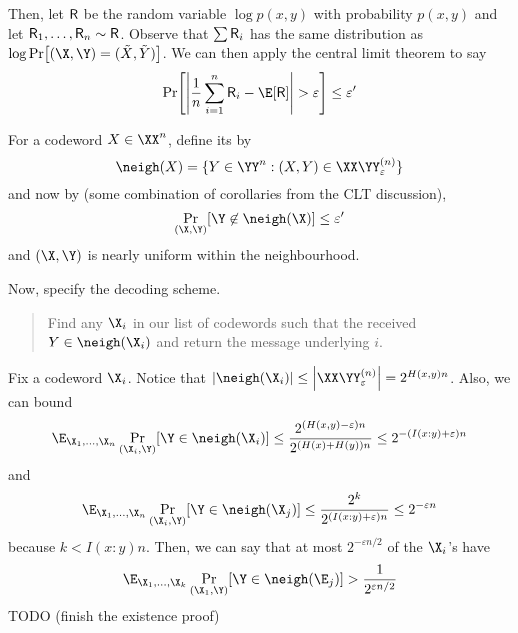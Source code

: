 \documentclass[class=co432,notes,tikz]{agony}
\begin{document}
\begin{prf}
  Then, let $\mathsf R$ be the random variable $\log p(x,y)$ with probability $p(x,y)$
  and let $\mathsf R_1,\dotsc,\mathsf R_n \sim \mathsf R$.
  Observe that $\sum \mathsf R_i$ has the same distribution as $\log \Pr[(\X,\Y)=(\tilde X,\tilde Y)]$.
  We can then apply the central limit theorem to say
  \[ \Pr[\abs{\frac1n\sum_{i=1}^n \rv R_i - \E[\rv R]} > \varepsilon] \leq \varepsilon' \]

  For a codeword $X \in \XX^n$, define its  by
  \[ \neigh(X) = \{Y \in \YY^n : (X,Y) \in \XX\YY_{\varepsilon}^{(n)}\} \]
  and now by (some combination of corollaries from the CLT discussion),
  \[ \Pr_{(\X,\Y)}[\Y \not\in \neigh(\X)] \leq \varepsilon' \]
  and $(\X,\Y)$ is nearly uniform within the neighbourhood.

  Now, specify the decoding scheme.
  \begin{quote}
    Find any $\X_i$ in our list of codewords
    such that the received $Y \in \neigh(\X_i)$
    and return the message underlying $i$.
  \end{quote}
  Fix a codeword $\X_i$.
  Notice that $\abs{\neigh(\X_i)} \leq \abs{\XX\YY_\varepsilon^{(n)}} = 2^{H(x,y)n}$.
  Also, we can bound
  \begin{align*}
    \E_{\X_1,\dotsc,\X_n}\Pr_{(\X_i,\Y)}[\Y \in \neigh(\X_i)] \leq \frac{2^{(H(x,y)-\varepsilon) n}}{2^{(H(x)+H(y))n}} \leq 2^{-(I(x:y)+\varepsilon)n}
  \end{align*}
  and
  \begin{align*}
    \E_{\X_1,\dotsc,\X_n}\Pr_{(\X_i,\Y)}[\Y \in \neigh(\X_j)] \leq \frac{2^k}{2^{(I(x:y) + \varepsilon)n}} \leq 2^{-\varepsilon n}
  \end{align*}
  because $k < I(x:y) n$.
  Then, we can say that at most $2^{-\varepsilon n/2}$ of the $\X_i$'s have
  \[
    \E_{\X_1,\dotsc,\X_k} \Pr_{(\X_1,\Y)}[\Y \in \neigh(\E_j)] > \frac{1}{2^{\varepsilon n/2}}
  \]
  TODO (finish the existence proof)


\end{prf}
\end{document}
